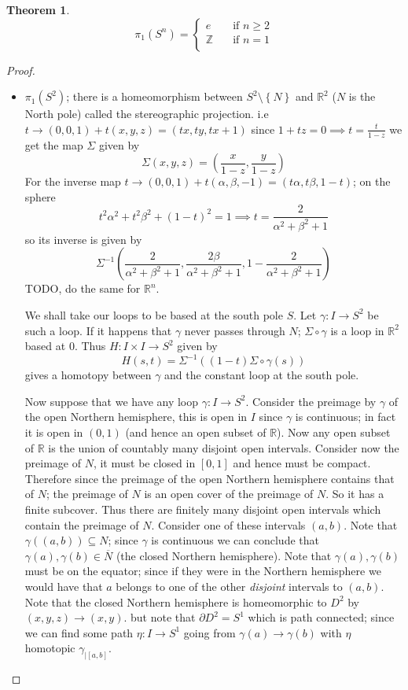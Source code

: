 \documentclass[11pt,a4paper]{article}
\theoremstyle{definition}
\theoremstyle{plain}
\newtheorem{theorem}[definition]{Theorem}
\theoremstyle{remark}
\newcommand{\R}{\mathbb{R}}
\newcommand{\Z}{\mathbb{Z}}
\renewcommand{\set}[1]{\left\{ #1 \right\}}
\newcommand{\1}{\mathbbm{1}}
\begin{document}
\begin{theorem}
    $$\pi_1(S^n) = \begin{cases}
       e \quad &\text{if } n \ge 2 \\
       \Z \quad &\text{if } n = 1 \\ 
    \end{cases}$$
\end{theorem}

\begin{proof}
    \begin{itemize}
        \item $\pi_1(S^2)$; there is a homeomorphism between $S^2 \setminus \set{N}$ and $\R^2$ ($N$ is the North pole) called the stereographic projection. 
        i.e $t \to (0,0,1) + t(x, y,z) = (tx,ty, tx + 1)$ since $1 + tz = 0 \implies t = \frac{t}{1-z}$ we get the map $\Sigma$ given by 
        $$\Sigma (x,y,z) = (\frac{x}{1-z}, \frac{y}{1-z})$$
        For the inverse map $t \to (0,0,1) + t(\alpha, \beta, -1) = (t \alpha, t \beta, 1 - t)$; on the sphere 
        $$t^2 \alpha^2 + t^2 \beta^2 + (1-t)^2 = 1 \implies t = \frac{2}{\alpha^2 + \beta^2 + 1}$$
        so its inverse is given by 
        $$\Sigma^{-1} (\frac{2}{\alpha^2 + \beta^2 + 1}, \frac{2 \beta}{\alpha^2 + \beta^2 + 1}, 1 - \frac{2}{\alpha^2 + \beta^2 + 1})$$
        TODO, do the same for $\R^n$. 

        We shall take our loops to be based at the south pole $S$. Let $\gamma \colon I \to S^2$ be such a loop. If it happens that $\gamma$ never passes through $N$; 
        $\Sigma \circ \gamma$ is a loop in $\R^2$ based at $0$. Thus $H \colon I \times I \to S^2$ given by 
        $$H(s, t) = \Sigma^{-1}\left((1-t) \Sigma \circ \gamma (s) \right)$$
        gives a homotopy between $\gamma$ and the constant loop at the south pole. 

        Now suppose that we have any loop $\gamma \colon I \to S^2$. Consider the preimage by $\gamma$ of the open Northern hemisphere, this is 
        open in $I$ since $\gamma$ is continuous; in fact it is open in $(0,1)$ (and hence an open subset of $\R$). Now any open subset of $\R$ is the union of countably many 
        disjoint open intervals. Consider now the preimage of $N$, it must be closed in $[0,1]$ and hence must be compact. Therefore since the preimage of the open Northern hemisphere 
        contains that of $N$; the preimage of $N$ is an open cover of the preimage of $N$. So it has a finite subcover. Thus there are finitely many disjoint open intervals which 
        contain the preimage of $N$. Consider one of these intervals $(a, b)$. Note that $\gamma((a,b)) \subseteq N$; since $\gamma$ is continuous we can conclude that 
        $\gamma(a), \gamma(b) \in \overline{N}$ (the closed Northern hemisphere). Note that $\gamma(a), \gamma(b)$ must be on the equator; since if they were in the Northern hemisphere we would have that 
        $a$ belongs to one of the other \emph{disjoint} intervals to $(a, b)$. Note that the closed Northern hemisphere is homeomorphic to $D^2$ by $(x, y, z) \to (x,y)$. 
        but note that $\partial D^2 = S^1$ which is path connected; since we can find some path $\eta \colon I \to S^1$ going from $\gamma(a) \to \gamma(b)$ with $\eta$ homotopic $\gamma_{|[a,b]}$. 


\end{itemize}
\end{proof}
\end{document}
